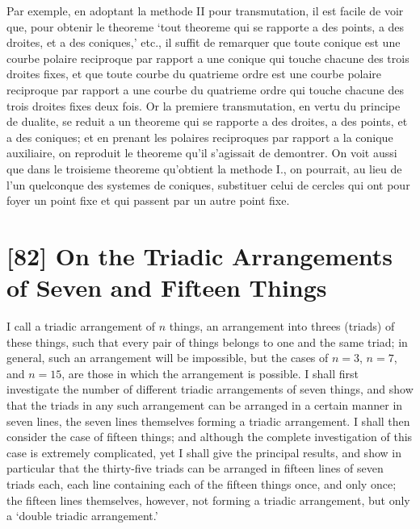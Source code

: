 \documentclass[11pt,a4paper]{book}
\begin{document}
Par exemple, en adoptant la methode II pour transmutation, il est facile de voir que, pour obtenir le theoreme `tout theoreme qui se rapporte a des points, a des droites, et a des coniques,' etc., il suffit de remarquer que toute conique est une courbe polaire reciproque par rapport a une conique qui touche chacune des trois droites fixes, et que toute courbe du quatrieme ordre est une courbe polaire reciproque par rapport a une courbe du quatrieme ordre qui touche chacune des trois droites fixes deux fois. Or la premiere transmutation, en vertu du principe de dualite, se reduit a un theoreme qui se rapporte a des droites, a des points, et a des coniques; et en prenant les polaires reciproques par rapport a la conique auxiliaire, on reproduit le theoreme qu'il s'agissait de demontrer. On voit aussi que dans le troisieme theoreme qu'obtient la methode I., on pourrait, au lieu de l'un quelconque des systemes de coniques, substituer celui de cercles qui ont pour foyer un point fixe et qui passent par un autre point fixe.

\newpage
\section*{[82] On the Triadic Arrangements of Seven and Fifteen Things}

\bigskip

I call a triadic arrangement of $n$ things, an arrangement into threes (triads) of these things, such that every pair of things belongs to one and the same triad; in general, such an arrangement will be impossible, but the cases of $n = 3$, $n = 7$, and $n = 15$, are those in which the arrangement is possible. I shall first investigate the number of different triadic arrangements of seven things, and show that the triads in any such arrangement can be arranged in a certain manner in seven lines, the seven lines themselves forming a triadic arrangement. I shall then consider the case of fifteen things; and although the complete investigation of this case is extremely complicated, yet I shall give the principal results, and show in particular that the thirty-five triads can be arranged in fifteen lines of seven triads each, each line containing each of the fifteen things once, and only once; the fifteen lines themselves, however, not forming a triadic arrangement, but only a `double triadic arrangement.'
\end{document}
